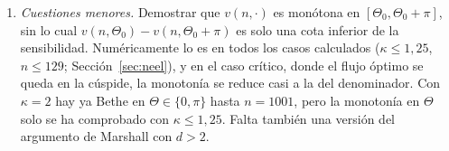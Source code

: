\documentclass[11pt,a4paper]{article}
\theoremstyle{remark}
\begin{document}
\begin{enumerate}
  En grafos con dos ciclos y holonomías que no conmutan no hay gauge uniforme ni un único flujo.
\item \emph{Cuestiones menores.} Demostrar que $v(n,\cdot)$ es monótona en
  $[\Theta_0,\Theta_0+\pi]$, sin lo cual $v(n,\Theta_0)-v(n,\Theta_0+\pi)$ es solo una cota inferior
  de la sensibilidad. Numéricamente lo es en todos los casos calculados ($\kappa\le1{,}25$,
  $n\le129$; Sección~\ref{sec:neel}), y en el caso crítico, donde el flujo óptimo se queda en la
  cúspide, la monotonía se reduce casi a la del denominador. Con $\kappa=2$ hay ya Bethe en $\Theta\in\{0,\pi\}$ hasta $n=1001$, pero la monotonía en
  $\Theta$ solo se ha comprobado con $\kappa\le1{,}25$. Falta también una versión del argumento de
  Marshall con $d>2$.
\end{enumerate}
\end{document}
